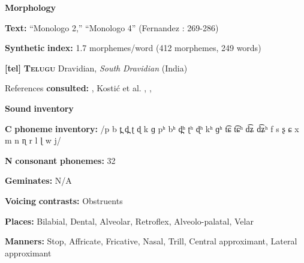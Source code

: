 \documentclass[output=paper]{langsci/langscibook}
\begin{document}
\begin{styleBody}
\textbf{Morphology}
\end{styleBody}

\begin{styleBody}
\textbf{Text:} “Monologo 2,” “Monologo 4” (Fernandez \citealt{GarayHernandez2006}: 269-286)
\end{styleBody}

\begin{styleBody}
\textbf{Synthetic} \textbf{index:} 1.7 morphemes/word (412 morphemes, 249 words)
\end{styleBody}

\begin{styleBody}
\textbf{[tel]}   \textbf{\textsc{Telugu}}    Dravidian, \textit{South} \textit{Dravidian} (India)
\end{styleBody}

\begin{styleBody}
References \textbf{consulted:} \citet{Kelley1963}, Kostić et al. , \citet{Krishnamurti1998}, \citet{BhaskararaoRay2017}
\end{styleBody}

\begin{styleBody}
\textbf{Sound} \textbf{inventory}
\end{styleBody}

\begin{styleBody}
\textbf{C} \textbf{phoneme} \textbf{inventory:} /p b t̪ d̪ ʈ ɖ k ɡ pʰ bʰ d̪ʰ ʈʰ ɖʰ kʰ ɡʰ t͡ɕ t͡ɕʰ d͡ʑ d͡ʑʰ f s ʂ ɕ x m n ɳ r l ɭ w j/
\end{styleBody}

\begin{styleBody}
\textbf{N} \textbf{consonant} \textbf{phonemes:} 32
\end{styleBody}

\begin{styleBody}
\textbf{Geminates:} N/A
\end{styleBody}

\begin{styleBody}
\textbf{Voicing} \textbf{contrasts:} Obstruents
\end{styleBody}

\begin{styleBody}
\textbf{Places:} Bilabial, Dental, Alveolar, Retroflex, Alveolo-palatal, Velar
\end{styleBody}

\begin{styleBody}
\textbf{Manners:} Stop, Affricate, Fricative, Nasal, Trill, Central approximant, Lateral approximant
\end{styleBody}
\end{document}
